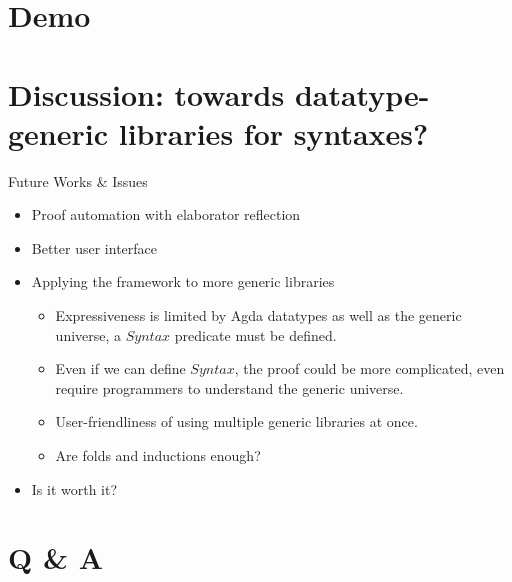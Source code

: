 \documentclass[10pt,xcolor=svgnames]{beamer} %
\newcommand{\mi}[1]{\ensuremath{\mathit{#1}}}
\begin{document}
\section{Demo}

\section{Discussion: towards datatype-generic libraries for syntaxes?}

\begin{frame}[fragile]{Future Works \& Issues}
	\begin{itemize}
		\item Proof automation with elaborator reflection 
		\item Better user interface
		\item Applying the framework to more generic libraries
		\pause
			\begin{itemize}
				\item Expressiveness is limited by Agda datatypes as well as the generic universe, a \mi{Syntax} predicate must be defined.
				\pause
				\item Even if we can define \mi{Syntax}, the proof could be more complicated, even require programmers to understand the generic universe.
				\pause
				\item User-friendliness of using multiple generic libraries at once.
				\pause
				\item Are folds and inductions enough?
			\end{itemize}
	\pause
	\item Is it worth it?
	\end{itemize}
\end{frame}

\section{Q \& A}
\end{document}
